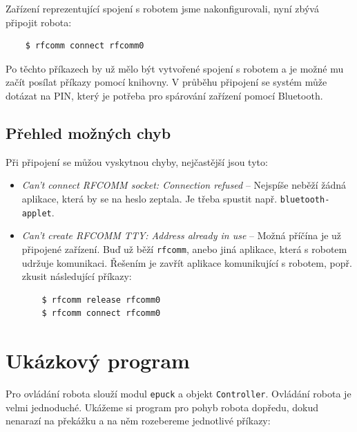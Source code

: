 \documentclass[12pt,notitlepage]{report}
\begin{document}
    Zařízení reprezentující spojení s robotem jsme nakonfigurovali, nyní zbývá
    připojit robota:

    \begin{verbatim}
    $ rfcomm connect rfcomm0
    \end{verbatim}

    Po těchto příkazech by už mělo být vytvořené spojení s robotem a je možné
    mu začít posílat příkazy pomocí knihovny. V průběhu připojení se systém
    může dotázat na PIN, který je potřeba pro spárování zařízení pomocí
    Bluetooth.

    \subsection{Přehled možných chyb}
    Při připojení se můžou vyskytnou chyby, nejčastější jsou tyto:
    \begin{itemize}
    \item{{\em Can't connect RFCOMM socket: Connection refused} -- Nejspíše
        neběží žádná aplikace, která by se na heslo zeptala. Je třeba spustit
        např. {\tt bluetooth-applet}.}
    \item{{\em Can't create RFCOMM TTY: Address already in use} -- Možná
        příčína je už připojené zařízení. Buď už běží {\tt rfcomm}, anebo jiná
        aplikace, která s robotem udržuje komunikaci. Řešením je zavřít
        aplikace komunikující s robotem, popř. zkusit následující příkazy:
    \begin{verbatim}
    $ rfcomm release rfcomm0
    $ rfcomm connect rfcomm0
    \end{verbatim}
    }
    \end{itemize}

    \section{Ukázkový program}
    \label{ukazkovy_program}

    Pro ovládání robota slouží modul {\tt epuck} a objekt {\tt Controller}.
    Ovládání robota je velmi jednoduché. Ukážeme si program pro pohyb robota
    dopředu, dokud nenarazí na překážku a na něm rozebereme jednotlivé příkazy:
\end{document}
